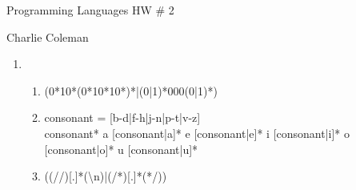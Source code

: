 \documentclass[12pt]{article}
\begin{document}
	\begin{center}\begin{large} Programming Languages HW \# 2 \end{large}\end{center}
	
	\hfill Charlie Coleman
	
	\begin{enumerate}
		\item 
			\begin{enumerate}
				\item (0*10*(0*10*10*)*|(0|1)*000(0|1)*)
				\item{} consonant = [b-d|f-h|j-n|p-t|v-z]\\
				consonant* a [consonant|a]* e [consonant|e]* i [consonant|i]* o [consonant|o]* u [consonant|u]*
				\item ((//)[.]*(\textbackslash n)|(/*)[.]*(*/))
				

\end{enumerate}
\end{enumerate}
\end{document}
